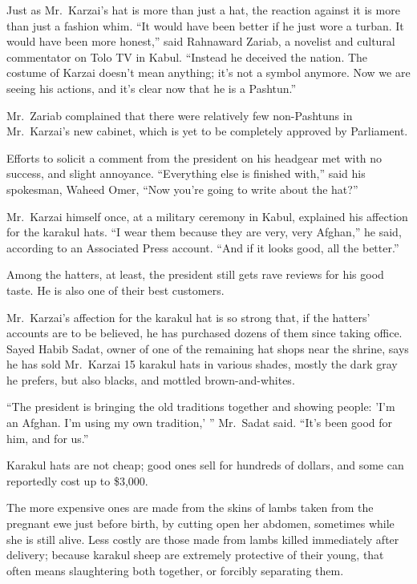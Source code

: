 ﻿\documentclass[12pt]{article}
\begin{document}
Just as Mr.~Karzai's hat is more than just a hat, the reaction against it is more than just a
fashion whim. ``It would have been better if he just wore a turban. It would have been more
honest,'' said Rahnaward Zariab, a novelist and cultural commentator on Tolo TV in Kabul. ``Instead
he deceived the nation. The costume of Karzai doesn't mean anything; it's not a symbol anymore. Now
we are seeing his actions, and it's clear now that he is a Pashtun.''

Mr.~Zariab complained that there were relatively few non-Pashtuns in Mr.~Karzai's new cabinet, which
is yet to be completely approved by Parliament.

Efforts to solicit a comment from the president on his headgear met with no success, and slight
annoyance. ``Everything else is finished with,'' said his spokesman, Waheed Omer, ``Now you're going
to write about the hat?''

Mr.~Karzai himself once, at a military ceremony in Kabul, explained his affection for the karakul
hats. ``I wear them because they are very, very Afghan,'' he said, according to an Associated Press
account. ``And if it looks good, all the better.''

Among the hatters, at least, the president still gets rave reviews for his good taste. He is also
one of their best customers.

Mr.~Karzai's affection for the karakul hat is so strong that, if the hatters' accounts are to be
believed, he has purchased dozens of them since taking office. Sayed Habib Sadat, owner of one of
the remaining hat shops near the shrine, says he has sold Mr.~Karzai 15 karakul hats in various
shades, mostly the dark gray he prefers, but also blacks, and mottled brown-and-whites.

``The president is bringing the old traditions together and showing people: 'I'm an Afghan. I'm
using my own tradition,' '' Mr.~Sadat said. ``It's been good for him, and for us.''

Karakul hats are not cheap; good ones sell for hundreds of dollars, and some can reportedly cost up
to \$3,000.

The more expensive ones are made from the skins of lambs taken from the pregnant ewe just before
birth, by cutting open her abdomen, sometimes while she is still alive. Less costly are those made
from lambs killed immediately after delivery; because karakul sheep are extremely protective of
their young, that often means slaughtering both together, or forcibly separating them.
\end{document}
